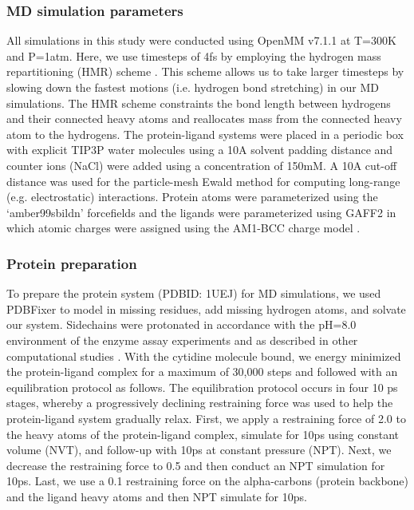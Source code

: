 \documentclass[fleqn,10pt]{wlscirep}
\begin{document}
\subsubsection{MD simulation parameters}
All simulations in this study were conducted using OpenMM v7.1.1 \cite{openmm} at T=300K and P=1atm.
Here, we use timesteps of 4fs by employing the hydrogen mass repartitioning (HMR) scheme \cite{hmr}.
This scheme allows us to take larger timesteps by slowing down the fastest motions (i.e. hydrogen bond stretching) in our MD simulations.
The HMR scheme constraints the bond length between hydrogens and their connected heavy atoms and reallocates mass from the connected heavy atom to the hydrogens.
The protein-ligand systems were placed in a periodic box with explicit TIP3P water molecules using a 10A solvent padding distance and counter ions (NaCl) were added using a concentration of 150mM.
A 10A cut-off distance was used for the particle-mesh Ewald method for computing long-range (e.g. electrostatic) interactions.
Protein atoms were parameterized using the `amber99sbildn' forcefields \cite{amber99sbildn} and the ligands were parameterized using GAFF2 \cite{ambergaff} in which atomic charges were assigned using the AM1-BCC charge model \cite{am1bcc}.

\subsubsection{Protein preparation}
To prepare the protein system (PDBID: 1UEJ) for MD simulations, we used PDBFixer \cite{pdbfixer} to model in missing residues, add missing hydrogen atoms, and solvate our system.
Sidechains were protonated in accordance with the pH=8.0 environment of the enzyme assay experiments \cite{doi:10.1021/bi102054n} and as described in other computational studies \cite{tanaka2016molecular}.
With the cytidine molecule bound, we energy minimized the protein-ligand complex for a maximum of 30,000 steps and followed with an equilibration protocol as follows.
The equilibration protocol occurs in four 10 ps stages, whereby a progressively declining restraining force was used to help the protein-ligand system gradually relax.
First, we apply a restraining force of 2.0 to the heavy atoms of the protein-ligand complex, simulate for 10ps using constant volume (NVT), and follow-up with 10ps at constant pressure (NPT).
Next, we decrease the restraining force to 0.5 and then conduct an NPT simulation for 10ps.
Last, we use a 0.1 restraining force on the alpha-carbons (protein backbone) and the ligand heavy atoms and then NPT simulate for 10ps.
\end{document}
